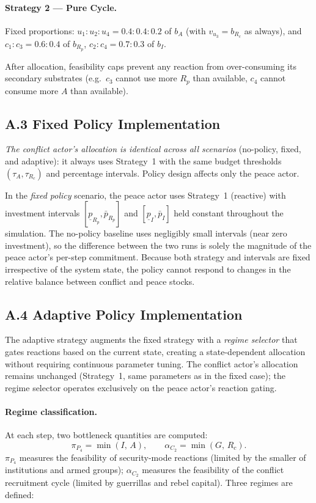\paragraph{Strategy 2 — Pure Cycle.}
Fixed proportions: $u_1{:}u_2{:}u_4 = 0.4{:}0.4{:}0.2$ of $b_A$ (with
$v_{u_3}=b_{R_c}$ as always), and $c_1{:}c_3 = 0.6{:}0.4$ of $b_{R_p}$,
$c_2{:}c_4 = 0.7{:}0.3$ of $b_I$.

After allocation, feasibility caps prevent any reaction from over-consuming its
secondary substrates (e.g.\ $c_3$ cannot use more $R_p$ than available,
$c_4$ cannot consume more $A$ than available).

\subsection*{A.3 Fixed Policy Implementation}

\emph{The conflict actor's allocation is identical across all scenarios}
(no-policy, fixed, and adaptive): it always uses Strategy~1 with the same
budget thresholds $(\tau_A, \tau_{R_c})$ and percentage intervals.  Policy
design affects only the peace actor.

In the \emph{fixed policy} scenario, the peace actor uses Strategy~1 (reactive)
with investment intervals $[\underline{p}_{R_p}, \bar{p}_{R_p}]$ and
$[\underline{p}_I, \bar{p}_I]$ held constant throughout the simulation.
The no-policy baseline uses negligibly small intervals (near zero investment),
so the difference between the two runs is solely the magnitude of the peace
actor's per-step commitment.  Because both strategy and intervals are fixed
irrespective of the system state, the policy cannot respond to changes in the
relative balance between conflict and peace stocks.

\subsection*{A.4 Adaptive Policy Implementation}

The adaptive strategy augments the fixed strategy with a \emph{regime selector}
that gates reactions based on the current state, creating a state-dependent
allocation without requiring continuous parameter tuning.  The conflict actor's
allocation remains unchanged (Strategy~1, same parameters as in the fixed case);
the regime selector operates exclusively on the peace actor's reaction gating.

\paragraph{Regime classification.}
At each step, two bottleneck quantities are computed:
\begin{equation}
    \pi_{P_4} = \min(I,\,A),
    \qquad
    \alpha_{C_2} = \min(G,\,R_c).
\end{equation}
$\pi_{P_4}$ measures the feasibility of security-mode reactions (limited by
the smaller of institutions and armed groups); $\alpha_{C_2}$ measures the
feasibility of the conflict recruitment cycle (limited by guerrillas and rebel
capital).  Three regimes are defined:

